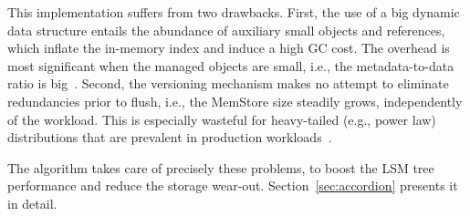 This implementation suffers from two drawbacks. First, the use of a big dynamic data structure entails 
the abundance of auxiliary small objects and references, which inflate the in-memory index and induce 
a high GC cost. The overhead is most significant when the managed objects are small, i.e., 
the metadata-to-data ratio is big~\cite{Wu2015}. Second, the versioning mechanism 
makes no attempt to eliminate redundancies prior to flush, i.e., the MemStore size  steadily grows, 
independently of the workload. This is especially wasteful for heavy-tailed (e.g., power law) distributions 
that are prevalent in production workloads~\cite{Devineni:2015}. 

The \sys\/ algorithm takes care of precisely these problems, to boost the 
LSM tree performance and reduce the storage wear-out. Section~\ref{sec:accordion} 
presents it in detail. 







